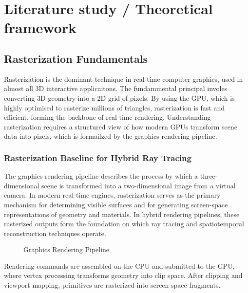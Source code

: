 \documentclass[12pt,a4paper]{report}
\newcommand{\daechapter}[1]{
  \chapter{#1}
}
\newcommand{\daesection}[1]{
  \section{#1}
}
\begin{document}
\daechapter{Literature study / Theoretical framework}

\daesection{Rasterization Fundamentals}
Rasterization is the dominant technique in real-time computer graphics, used in almost all 3D interactive applicaitons. The fundammental principal involes converting 3D geometry into a 2D grid of pixels.
By using the GPU, which is highly optimised to rasterize millions of triangles, rasterization is fast and efficient, forming the backbone of real-time rendering.
Understanding rasterization requires a structured view of how modern GPUs transform scene data into pizels, which is formailzed by the graphics rendering pipeline.\cite{Marshner2016FCP}

\subsection{Rasterization Baseline for Hybrid Ray Tracing}

The graphics rendering pipeline describes the process by which a three-dimensional
scene is transformed into a two-dimensional image from a virtual camera.
In modern real-time engines, rasterization serves as the primary mechanism for
determining visible surfaces and for generating screen-space representations of
geometry and materials.
In hybrid rendering pipelines, these rasterized outputs form the foundation on
which ray tracing and spatiotemporal reconstruction techniques operate.


\begin{figure}[H]
\centering
{} 
\caption{Graphics Rendering Pipeline}
\label{fig:Graphics-Rendering-Pipeline}
\end{figure}

Rendering commands are assembled on the CPU and submitted to the GPU, where vertex processing transforms geometry into clip
space. After clipping and viewport mapping, primitives are rasterized into
screen-space fragments.
\end{document}
